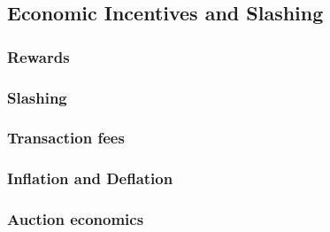 \subsection{Economic Incentives and Slashing}\label{sec:economics}

\subsubsection{Rewards}

\subsubsection{Slashing}

\subsubsection{Transaction fees}

\subsubsection{Inflation and Deflation}

\subsubsection{Auction economics}
